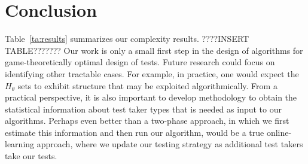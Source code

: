 \documentclass{article}
\begin{document}




\section{Conclusion}
Table~\ref{ta:results} summarizes our complexity results.
????INSERT TABLE???????
Our work is only a small first step in the design of algorithms for
game-theoretically optimal design of tests.  Future research could
focus on identifying other tractable cases.  For example, in practice,
one would expect the $H_\theta$ sets to exhibit structure that may be
exploited algorithmically.  From a practical perspective, it is also
important to develop methodology to obtain the statistical information
about test taker types that is needed as input to our algorithms.
Perhaps even better than a two-phase approach, in which we first
estimate this information and then run our algorithm, would be a true
online-learning approach, where we update our testing strategy as
additional test takers take our tests.
\end{document}
